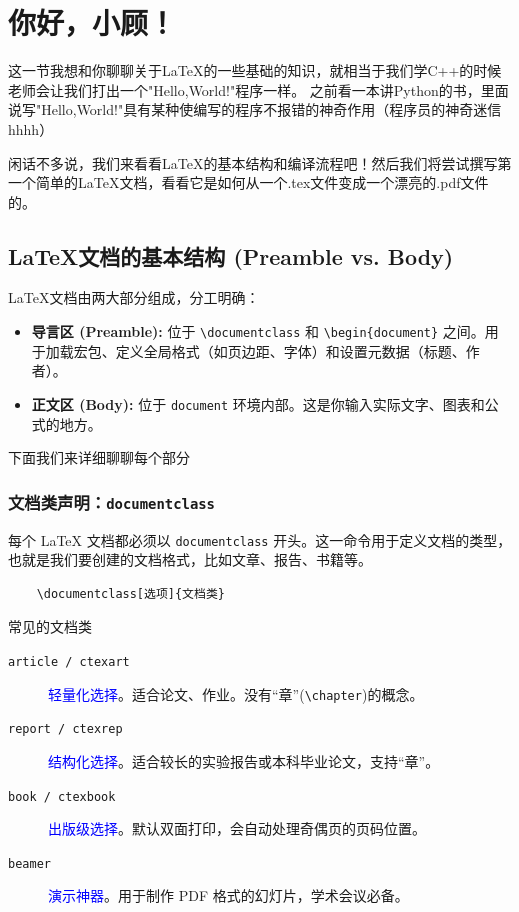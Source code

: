 \chapter{你好，小顾！}
这一节我想和你聊聊关于\LaTeX 的一些基础的知识，就相当于我们学C++的时候老师会让我们打出一个"Hello,World!"程序一样。
之前看一本讲Python的书，里面说写"Hello,World!"具有某种使编写的程序不报错的神奇作用（程序员的神奇迷信hhhh）

闲话不多说，我们来看看\LaTeX 的基本结构和编译流程吧！然后我们将尝试撰写第一个简单的\LaTeX 文档，看看它是如何从一个.tex文件变成一个漂亮的.pdf文件的。
\section{\LaTeX 文档的基本结构 (Preamble vs. Body)}
\LaTeX 文档由两大部分组成，分工明确：

\begin{itemize}
    \item \textbf{导言区 (Preamble):} 位于 \texttt{\textbackslash documentclass} 和 \texttt{\textbackslash begin\{document\}} 之间。用于加载宏包、定义全局格式（如页边距、字体）和设置元数据（标题、作者）。
    \item \textbf{正文区 (Body):} 位于 \texttt{document} 环境内部。这是你输入实际文字、图表和公式的地方。
\end{itemize}
下面我们来详细聊聊每个部分
\subsection{文档类声明：\texttt{documentclass}}
每个 LaTeX 文档都必须以 \texttt{documentclass} 开头。这一命令用于定义文档的类型，也就是我们要创建的文档格式，比如文章、报告、书籍等。
\begin{lstlisting}
	\documentclass[选项]{文档类}	
\end{lstlisting}

\begin{mybox}{常见的文档类}

    \begin{description}
        \item[\texttt{article / ctexart}] \textcolor{blue}{轻量化选择}。适合论文、作业。没有“章”(\texttt{\textbackslash chapter})的概念。
        \item[\texttt{report / ctexrep}] \textcolor{blue}{结构化选择}。适合较长的实验报告或本科毕业论文，支持“章”。
        \item[\texttt{book / ctexbook}] \textcolor{blue}{出版级选择}。默认双面打印，会自动处理奇偶页的页码位置。
        \item[\texttt{beamer}] \textcolor{blue}{演示神器}。用于制作 PDF 格式的幻灯片，学术会议必备。
    \end{description}
\end{mybox}

